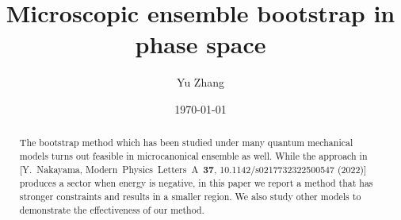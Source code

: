 \documentclass[aps, preprint,amsmath, amssymb]{revtex4-2}
\begin{document}

\title{Microscopic ensemble bootstrap in phase space}


\author{Yu Zhang}


\date{\today}

\begin{abstract}
	The bootstrap method which has been studied under many quantum mechanical models turns out feasible in microcanonical ensemble as well. While the approach in [Y.\ Nakayama, Modern\ Physics\ Letters\ A\ \textbf{37}, 10.1142/s0217732322500547 (2022)] produces a sector when energy is negative, in this paper we report a method that has stronger constraints and results in a smaller region. We also study other models to demonstrate the effectiveness of our method.
\end{abstract}

\end{document}
